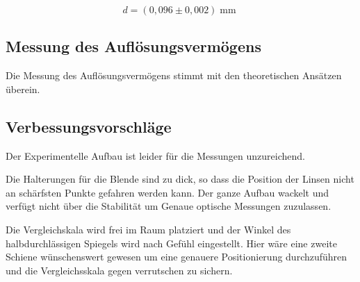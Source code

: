 \documentclass[a4paper,german,12pt,smallheadings]{scrartcl}
\begin{document}
\begin{equation}
  d = (0{,}096\pm0{,}002) \operatorname{mm}
\end{equation}

\subsection{Messung des Auflösungsvermögens}

Die Messung des Auflösungsvermögens stimmt mit den theoretischen Ansätzen
überein.

\subsection{Verbessungsvorschläge}

Der Experimentelle Aufbau ist leider für die Messungen unzureichend.

Die Halterungen für die Blende sind zu dick, so dass die Position der Linsen
nicht an schärfsten Punkte gefahren werden kann. Der ganze Aufbau wackelt und
verfügt nicht über die Stabilität um Genaue optische Messungen zuzulassen.

Die Vergleichskala wird frei im Raum platziert und der Winkel des
halbdurchlässigen Spiegels wird nach Gefühl eingestellt. Hier wäre eine zweite
Schiene wünschenswert gewesen um eine genauere Positionierung durchzuführen und
die Vergleichsskala gegen verrutschen zu sichern.
\end{document}

